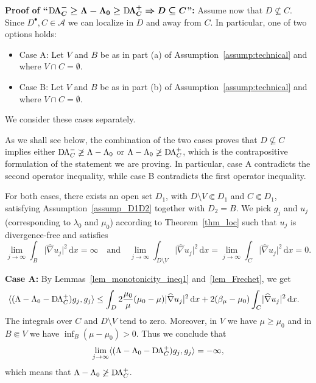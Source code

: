 \documentclass[reqno]{amsart}
\numberwithin{equation}{section}
\numberwithin{figure}{section}
\numberwithin{table}{section}
\newcommand{\abs}[1]{\lvert#1\rvert}
\newcommand{\inner}[1]{\langle#1\rangle}
\newcommand{\di}{\mathrm{d}}
\newcommand{\DLambda}{\textup{D}\mkern-1.5mu \Lambda}
\theoremstyle{definition}
\theoremstyle{plain}
\theoremstyle{definition}
\theoremstyle{remark}
\numberwithin{equation}{section}
\begin{document}
\textbf{Proof of ``$\boldsymbol{\DLambda_C^- \geq \Lambda - \Lambda_0 \geq \DLambda_C^+ \Rightarrow D\subseteq C}$'':} Assume now that $D\not\subseteq C$. Since $D^\bullet,C\in\mathcal{A}$ we can localize in $D$ and away from $C$. In particular, one of two options holds:
%
\begin{itemize}
\item[$\diamond$] Case A: Let $V$ and $B$ be as in part (a) of Assumption~\ref{assump:technical} and where $V\cap C = \emptyset$.
\item[$\diamond$] Case B: Let $V$ and $B$ be as in part (b) of Assumption~\ref{assump:technical} and where $V\cap C = \emptyset$.
\end{itemize}
%
We consider these cases separately. 

As we shall see below, the combination of the two cases proves that $D\not\subseteq C$ implies either $\DLambda_C^- \not\geq \Lambda-\Lambda_0$ or $\Lambda-\Lambda_0 \not\geq \DLambda_C^+$, which is the contrapositive formulation of the statement we are proving. In particular, case A contradicts the second operator inequality, while case B contradicts the first operator inequality. 

For both cases, there exists an open set $D_1$, with $D\setminus V \Subset D_1$ and $C\Subset D_1$, satisfying Assumption~\ref{assump_D1D2} together with $D_2 = B$. We pick $g_j$ and $u_j$ (corresponding to $\lambda_0$ and $\mu_0$) according to Theorem~\ref{thm_loc} such that $u_j$ is divergence-free and satisfies
%
\begin{equation*}
	\lim_{j\to\infty}\int_B \abs{\widehat{\nabla}u_j}^2\,\di x = \infty \quad \text{and}\quad \lim_{j\to\infty}\int_{D\setminus V} \abs{\widehat{\nabla}u_j}^2\,\di x = \lim_{j\to\infty}\int_{C} \abs{\widehat{\nabla}u_j}^2\,\di x = 0.
\end{equation*}
%

\textbf{Case A:} By Lemmas~\ref{lem_monotonicity_ineq1} and~\ref{lem_Frechet}, we get
%
\begin{align*}
	\inner{(\Lambda - \Lambda_0 - \DLambda_C^+)g_j,g_j} &\leq \int_{D} 2\frac{\mu_0}{\mu}(\mu_0-\mu)\abs{\widehat{\nabla}u_j}^2\,\di x + 2(\beta_\mu-\mu_0)\int_C \abs{\widehat{\nabla}u_j}^2\,\di x. 
\end{align*}
%
The integrals over $C$ and $D\setminus V$ tend to zero. Moreover, in $V$ we have $\mu\geq \mu_0$ and in $B\Subset V$ we have $\inf_B(\mu-\mu_0)>0$. Thus we conclude that
%
\begin{equation*}
	\lim_{j\to\infty}\inner{(\Lambda - \Lambda_0 - \DLambda_C^+)g_j,g_j} = -\infty,
\end{equation*}
%
which means that $\Lambda-\Lambda_0 \not\geq \DLambda_C^+$.
\end{document}
